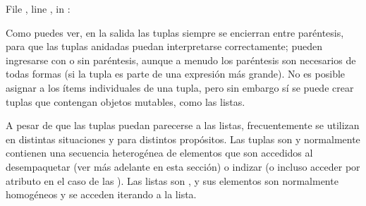 \documentclass[a4,10pt,spanish]{sphinxmanual}
\begin{document}
\begin{sphinxVerbatim}[commandchars=\\\{\}]
    
\PYG{p}{[}\PYG{p}{]}
       
\PYG{p}{[}\PYG{p}{]}  
  File , line , in 
: 
  \PYG{p}{[}  \PYG{p}{]} \PYG{p}{[}  \PYG{p}{]}
\end{sphinxVerbatim}

\sphinxAtStartPar
Como puedes ver, en la salida las tuplas siempre se encierran entre paréntesis, para que las tuplas anidadas puedan interpretarse correctamente; pueden ingresarse con o sin paréntesis, aunque a menudo los paréntesis son necesarios de todas formas (si la tupla es parte de una expresión más grande).  No es posible asignar a los ítems individuales de una tupla, pero sin embargo sí se puede crear tuplas que contengan objetos mutables, como las listas.

\sphinxAtStartPar
A pesar de que las tuplas puedan parecerse a las listas, frecuentemente se utilizan en distintas situaciones y para distintos propósitos.  Las tuplas son {\hyperref[\detokenize{glossary:term-immutable}]{}} y normalmente contienen una secuencia heterogénea de elementos que son accedidos al desempaquetar (ver más adelante en esta sección) o indizar (o incluso acceder por atributo en el caso de las ).  Las listas son {\hyperref[\detokenize{glossary:term-mutable}]{}}, y sus elementos son normalmente homogéneos y se acceden iterando a la lista.
\end{document}
